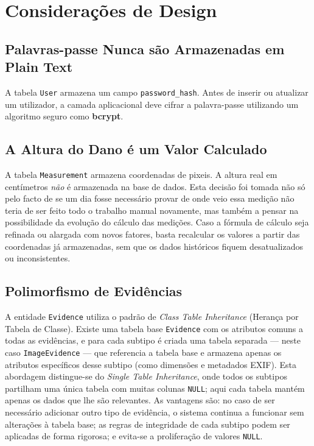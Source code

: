\documentclass[12pt, a4paper]{article}
\begin{document}
\section{Considerações de Design}

\subsection{Palavras-passe Nunca são Armazenadas em Plain Text}

A tabela \texttt{User} armazena um campo \texttt{password\_hash}. Antes de inserir ou atualizar um utilizador, a camada aplicacional deve cifrar a palavra-passe utilizando um algoritmo seguro como \textbf{bcrypt}.

\subsection{A Altura do Dano é um Valor Calculado}

A tabela \texttt{Measurement} armazena coordenadas de pixeis. A altura real em centímetros \emph{não} é armazenada na base de dados. Esta decisão foi tomada não só pelo facto de se um dia fosse necessário provar de onde veio essa medição não teria de ser feito todo o trabalho manual novamente, mas também a pensar na possibilidade da evolução do cálculo das medições. Caso a fórmula de cálculo seja refinada ou alargada com novos fatores, basta recalcular os valores a partir das coordenadas já armazenadas, sem que os dados históricos fiquem desatualizados ou inconsistentes.

\subsection{Polimorfismo de Evidências}

A entidade \texttt{Evidence} utiliza o padrão de \emph{Class Table Inheritance} (Herança por Tabela de Classe). Existe uma tabela base \texttt{Evidence} com os atributos comuns a todas as evidências, e para cada subtipo é criada uma tabela separada --- neste caso \texttt{ImageEvidence} --- que referencia a tabela base e armazena apenas os atributos específicos desse subtipo (como dimensões e metadados EXIF). Esta abordagem distingue-se do \emph{Single Table Inheritance}, onde todos os subtipos partilham uma única tabela com muitas colunas \texttt{NULL}; aqui cada tabela mantém apenas os dados que lhe são relevantes. As vantagens são: no caso de ser necessário adicionar outro tipo de evidência, o sistema continua a funcionar sem alterações à tabela base; as regras de integridade de cada subtipo podem ser aplicadas de forma rigorosa; e evita-se a proliferação de valores \texttt{NULL}.
\end{document}
